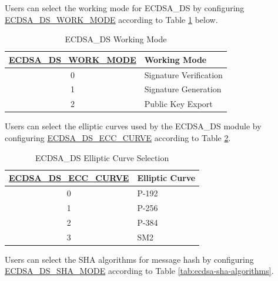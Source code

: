 \documentclass[main\_\_EN.tex]{subfiles}
\begin{document}
Users can select the working mode for ECDSA\_DS by configuring \hyperref[fielddesc:ECDSADSWORKMODE]{ECDSA\_DS\_WORK\_MODE} according to Table \ref{tab:ecdsa-working-mode} below.

\begin{table}[H]
    \centering
    \caption{ECDSA\_DS Working Mode}
    \label{tab:ecdsa-working-mode}
    \begin{tabular}{ | c | l | }
    \hline
        \rowcolor{lightgray}
        \textbf{\hyperref[fielddesc:ECDSADSWORKMODE]{ECDSA\_DS\_WORK\_MODE}}      & \textbf{Working Mode}\\\hline
        0                       & Signature Verification    \\\hline
        1                       & Signature Generation      \\\hline
        2                       & Public Key Export         \\\hline
    \end{tabular}
\end{table}

Users can select the elliptic curves used by the ECDSA\_DS module by configuring \hyperref[fielddesc:ECDSADSECCCURVE]{ECDSA\_DS\_ECC\_CURVE} according to Table \ref{tab:ecdsa-curve-selection}.

\begin{table}[H]
    \centering
    \caption{ECDSA\_DS Elliptic Curve Selection}
    \label{tab:ecdsa-curve-selection}
    \begin{tabular}{ | c | l | }
    \hline
        \rowcolor{lightgray}
        \textbf{\hyperref[fielddesc:ECDSADSECCCURVE]{ECDSA\_DS\_ECC\_CURVE}}      & \textbf{Elliptic Curve}\\
        \hline
        0                       & P-192    \\\hline
        1                       & P-256    \\\hline
        2                       & P-384    \\\hline
        3                       & SM2      \\\hline
    \end{tabular}
\end{table}

Users can select the SHA algorithms for message hash by configuring \hyperref[fielddesc:ECDSADSSHAMODE]{ECDSA\_DS\_SHA\_MODE} according to Table \ref{tab:ecdsa-sha-algorithms}.
\end{document}
